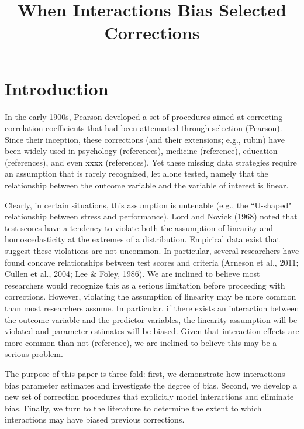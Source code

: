 \documentclass[man, babel,english]{apa}%
\title{When Interactions Bias Selected Corrections}
\begin{document}


\maketitle   



\section{Introduction} 
In the early 1900s, Pearson developed a set of procedures aimed at correcting correlation coefficients that had been attenuated through selection (Pearson). Since their inception, these corrections (and their extensions; e.g., rubin) have been widely used in psychology (references), medicine (reference), education (references), and even xxxx (references). Yet these missing data strategies require an assumption that is rarely recognized, let alone tested, namely that the relationship between the outcome variable and the variable of interest is linear. 

Clearly, in certain situations, this assumption is untenable (e.g., the ``U-shaped"  relationship between stress and performance). Lord and Novick (1968) noted that test scores have a tendency to violate both the assumption of linearity and homoscedasticity at the extremes of a distribution. Empirical data exist that suggest these violations are not uncommon. In particular, several researchers have found concave relationships between test scores and criteria (Arneson et al., 2011; Cullen et al., 2004; Lee \& Foley, 1986). We are inclined to believe most researchers would recognize this as a serious limitation before proceeding with corrections. However, violating the assumption of linearity may be more common than most researchers assume. In particular, if there exists an interaction between the outcome variable and the predictor variables, the linearity assumption will be violated and parameter estimates will be biased. Given that interaction effects are more common than not (reference), we are inclined to believe this may be a serious problem. 

The purpose of this paper is three-fold: first, we demonstrate how interactions bias parameter estimates and investigate the degree of bias. Second, we develop a new set of correction procedures that explicitly model interactions and eliminate bias. Finally, we turn to the literature to determine the extent to which interactions may have biased previous corrections. 
\end{document}
